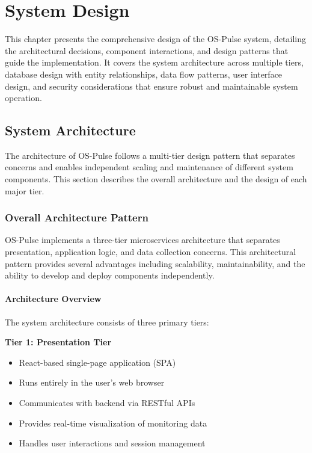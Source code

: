 \chapter{System Design}

This chapter presents the comprehensive design of the OS-Pulse system, detailing the architectural decisions, component interactions, and design patterns that guide the implementation. It covers the system architecture across multiple tiers, database design with entity relationships, data flow patterns, user interface design, and security considerations that ensure robust and maintainable system operation.

\section{System Architecture}

The architecture of OS-Pulse follows a multi-tier design pattern that separates concerns and enables independent scaling and maintenance of different system components. This section describes the overall architecture and the design of each major tier.

\subsection{Overall Architecture Pattern}

OS-Pulse implements a three-tier microservices architecture that separates presentation, application logic, and data collection concerns. This architectural pattern provides several advantages including scalability, maintainability, and the ability to develop and deploy components independently.

\subsubsection{Architecture Overview}

The system architecture consists of three primary tiers:

\textbf{Tier 1: Presentation Tier}
\begin{itemize}
    \item React-based single-page application (SPA)
    \item Runs entirely in the user's web browser
    \item Communicates with backend via RESTful APIs
    \item Provides real-time visualization of monitoring data
    \item Handles user interactions and session management
\end{itemize}

